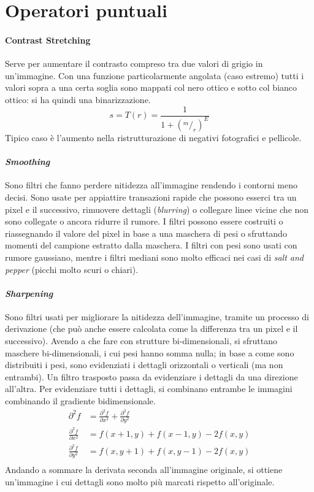 \documentclass[11pt, a4page]{article}
\begin{document}
\section{Operatori puntuali}

\paragraph{Contrast Stretching}
Serve per aumentare il contrasto compreso tra due valori di grigio in un'immagine.
Con una funzione particolarmente angolata (caso estremo) tutti i valori sopra a una certa soglia sono mappati col nero ottico e sotto col bianco ottico: si ha quindi una binarizzazione.
\begin{equation*}
  s = T(r) = \frac{1}{1 + (^m/_r)^E}
\end{equation*}
Tipico caso è l'aumento nella ristrutturazione di negativi fotografici e pellicole.

\paragraph{\textit{Smoothing}}
Sono filtri che fanno perdere nitidezza all'immagine rendendo i contorni meno decisi.
Sono usate per appiattire transazioni rapide che possono esserci tra un pixel e il successivo, rimuovere dettagli (\textit{blurring}) o collegare linee vicine che non sono collegate o ancora ridurre il rumore.
I filtri possono essere costruiti o riassegnando il valore del pixel in base a una maschera di pesi o sfruttando momenti del campione estratto dalla maschera.
I filtri con pesi sono usati con rumore gaussiano, mentre i filtri mediani sono molto efficaci nei casi di \textit{salt and pepper} (picchi molto scuri o chiari).

\paragraph{\textit{Sharpening}}
Sono filtri usati per migliorare la nitidezza dell'immagine, tramite un processo di derivazione (che può anche essere calcolata come la differenza tra un pixel e il successivo).
Avendo a che fare con strutture bi-dimensionali, si sfruttano maschere bi-dimensionali, i cui pesi hanno somma nulla; in base a come sono distribuiti i pesi, sono evidenziati i dettagli orizzontali o verticali (ma non entrambi).
Un filtro trasposto passa da evidenziare i dettagli da una direzione all'altra.
Per evidenziare tutti i dettagli, si combinano entrambe le immagini combinando il gradiente bidimensionale.
\begin{align*}
  \partial^2 f &= \frac{\partial^2 f}{\partial x^2} + \frac{\partial^2 f}{\partial y^2} \\
  \frac{\partial^2 f}{\partial x^2} &= f(x + 1, y) + f(x - 1, y) - 2 f(x, y) \\
  \frac{\partial^2 f}{\partial y^2} &= f(x, y + 1) + f(x, y - 1) - 2 f(x, y) \\
\end{align*}
Andando a sommare la derivata seconda all'immagine originale, si ottiene un'immagine i cui dettagli sono molto più marcati rispetto all'originale.
\end{document}
